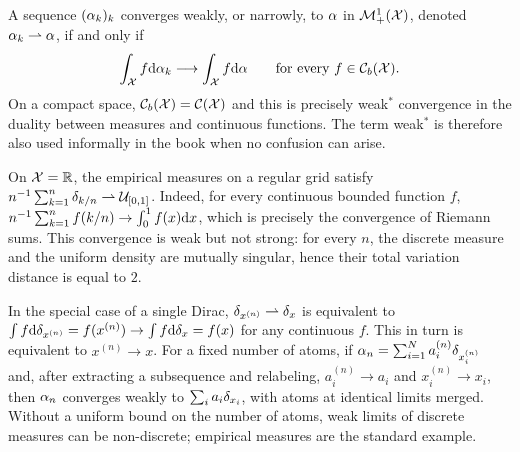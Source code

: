\begin{defn}\label{dfn-weak-conv}
		A sequence $(\alpha_k)_k$ converges weakly, or narrowly, to $\alpha$ in $\mathcal{M}_+^1(\mathcal{X})$, denoted $\alpha_k \rightharpoonup \alpha$, if and only if
		\[
			\int_{\mathcal{X}} f\mathrm{d}\alpha_k\longrightarrow\int_{\mathcal{X}} f\mathrm{d}\alpha
			\qquad\text{for every }f\in\mathcal{C}_b(\mathcal{X}).
		\]
		On a compact space, $\mathcal{C}_b(\mathcal{X})=\mathcal{C}(\mathcal{X})$ and this is precisely weak$^*$ convergence in the duality between measures and continuous functions. The term weak$^*$ is therefore also used informally in the book when no confusion can arise.
\end{defn}

\begin{rem}\label{rem-riemann-weak-limit}
	On $\mathcal{X}=\mathbb{R}$, the empirical measures on a regular grid satisfy
	$n^{-1}\sum_{k=1}^n\delta_{k/n}\rightharpoonup\mathcal{U}_{[0,1]}$.
	Indeed, for every continuous bounded function $f$,
	$n^{-1}\sum_{k=1}^nf(k/n)\to\int_0^1f(x)\mathrm{d} x$,
	which is precisely the convergence of Riemann sums. This convergence is weak but not strong: for every $n$, the discrete measure and the uniform density are mutually singular, hence their total variation distance is equal to $2$.
\end{rem}

\begin{rem}\label{rem-weak-conv-disc}
	In the special case of a single Dirac, $\delta_{x^{(n)}} \rightharpoonup \delta_x$ is equivalent to $\int f \mathrm{d}\delta_{x^{(n)}} = f(x^{(n)}) \rightarrow \int f \mathrm{d}\delta_{x} = f(x)$ for any continuous $f$. This in turn is equivalent to $x^{(n)} \rightarrow x$.
	For a fixed number of atoms, if $\alpha_n=\sum_{i=1}^N a_i^{(n)}\delta_{x_i^{(n)}}$ and, after extracting a subsequence and relabeling, $a_i^{(n)}\to a_i$ and $x_i^{(n)}\to x_i$, then $\alpha_n$ converges weakly to $\sum_i a_i\delta_{x_i}$, with atoms at identical limits merged. Without a uniform bound on the number of atoms, weak limits of discrete measures can be non-discrete; empirical measures are the standard example.
\end{rem}

